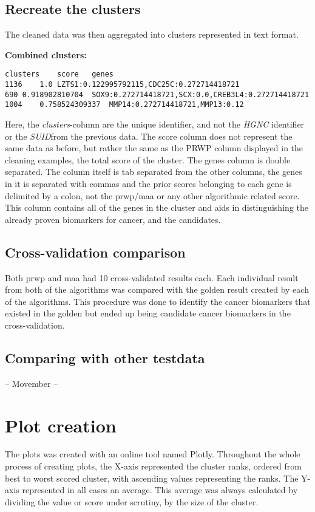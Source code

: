 \subsection{Recreate the clusters}
The cleaned data was then aggregated into clusters represented in text format.

\textbf{Combined clusters:}
\begin{verbatim}
clusters	score	genes
1136	1.0	LZTS1:0.122995792115,CDC25C:0.272714418721
690	0.918902810704	SOX9:0.272714418721,SCX:0.0,CREB3L4:0.272714418721
1004	0.758524309337	MMP14:0.272714418721,MMP13:0.12
\end{verbatim}

Here, the \textit{clusters}-column are the unique identifier, and not the
\textit{HGNC} identifier or the \textit{SUID}from the previous data. The score
column does not represent the same data as before, but rather the same as the
PRWP column displayed in the cleaning examples, the total score of the cluster.
The genes column is double separated. The column itself is tab separated from
the other columns, the genes in it is separated with commas and the prior scores
belonging to each gene is delimited by a colon, not the \gls{prwp}/\gls{maa} or any other
algorithmic related score. This column contains all of the genes in the cluster
and aids in distinguishing the already proven biomarkers for cancer, and the
candidates.

\subsection{Cross-validation comparison}
Both \gls{prwp} and \gls{maa} had 10 cross-validated results each. Each individual result
from both of the algorithms was compared with the \gls{golden} result created by
each of the algorithms. This procedure was done to identify the cancer
biomarkers that existed in the \gls{golden} but ended up being candidate cancer
biomarkers in the cross-validation.

\subsection{Comparing with other testdata}
-- Movember --

\section{Plot creation}
The plots was created with an online tool named Plotly\cite{plotly}. Throughout
the whole process of creating plots, the X-axis represented the cluster ranks,
ordered from best to worst scored cluster, with ascending values representing
the ranks. The Y-axis represented in all cases an average. This average was
always calculated by dividing the value or score under scrutiny, by the size of
the cluster.
